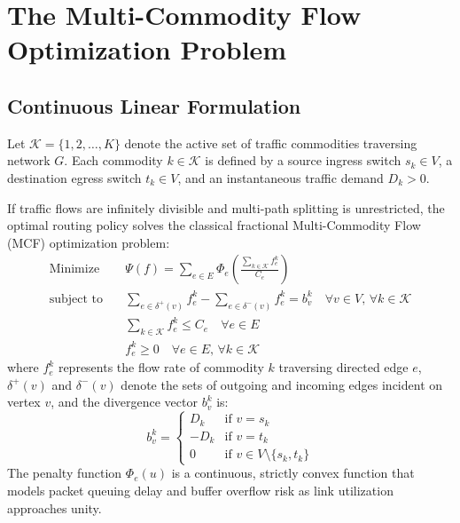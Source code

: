 \section{The Multi-Commodity Flow Optimization Problem}

\subsection{Continuous Linear Formulation}
Let $\mathcal{K} = \{1, 2, \dots, K\}$ denote the active set of traffic commodities traversing network $G$. Each commodity $k \in \mathcal{K}$ is defined by a source ingress switch $s_k \in V$, a destination egress switch $t_k \in V$, and an instantaneous traffic demand $D_k > 0$.

If traffic flows are infinitely divisible and multi-path splitting is unrestricted, the optimal routing policy solves the classical fractional Multi-Commodity Flow (MCF) optimization problem:
\begin{align}
    \text{Minimize} \quad & \Psi(f) = \sum_{e \in E} \Phi_e\left( \frac{\sum_{k \in \mathcal{K}} f_e^k}{C_e} \right) \label{eq:mcf_objective} \\
    \text{subject to} \quad & \sum_{e \in \delta^+(v)} f_e^k - \sum_{e \in \delta^-(v)} f_e^k = b_v^k \quad \forall v \in V, \, \forall k \in \mathcal{K} \label{eq:mcf_conservation} \\
    & \sum_{k \in \mathcal{K}} f_e^k \le C_e \quad \forall e \in E \label{eq:mcf_capacity} \\
    & f_e^k \ge 0 \quad \forall e \in E, \, \forall k \in \mathcal{K} \label{eq:mcf_nonnegative}
\end{align}
where $f_e^k$ represents the flow rate of commodity $k$ traversing directed edge $e$, $\delta^+(v)$ and $\delta^-(v)$ denote the sets of outgoing and incoming edges incident on vertex $v$, and the divergence vector $b_v^k$ is:
\begin{equation}
    b_v^k = \begin{cases}
        D_k & \text{if } v = s_k \\
        -D_k & \text{if } v = t_k \\
        0 & \text{if } v \in V \setminus \{s_k, t_k\}
    \end{cases}
\end{equation}
The penalty function $\Phi_e(u)$ is a continuous, strictly convex function that models packet queuing delay and buffer overflow risk as link utilization approaches unity.

